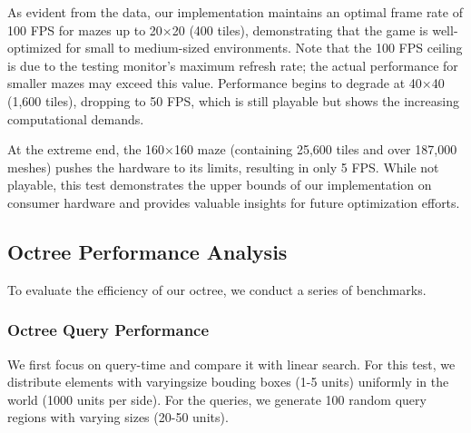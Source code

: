 \documentclass{article}
\begin{document}
As evident from the data, our implementation maintains an optimal frame rate of 100 FPS for mazes up to 20×20 (400 tiles), demonstrating that the game is well-optimized for small to medium-sized environments. Note that the 100 FPS ceiling is due to the testing monitor's maximum refresh rate; the actual performance for smaller mazes may exceed this value. Performance begins to degrade at 40×40 (1,600 tiles), dropping to 50 FPS, which is still playable but shows the increasing computational demands.

At the extreme end, the 160×160 maze (containing 25,600 tiles and over 187,000 meshes) pushes the hardware to its limits, resulting in only 5 FPS. While not playable, this test demonstrates the upper bounds of our implementation on consumer hardware and provides valuable insights for future optimization efforts.

\subsection{Octree Performance Analysis}
To evaluate the efficiency of our octree, we conduct a series of benchmarks.

\subsubsection{Octree Query Performance}
We first focus on query-time and compare it with linear search. For this test,
we distribute elements with varyingsize bouding boxes (1-5 units) uniformly in
the world (1000 units per side). For the queries, we generate 100 random
query regions with varying sizes (20-50 units).
\end{document}
